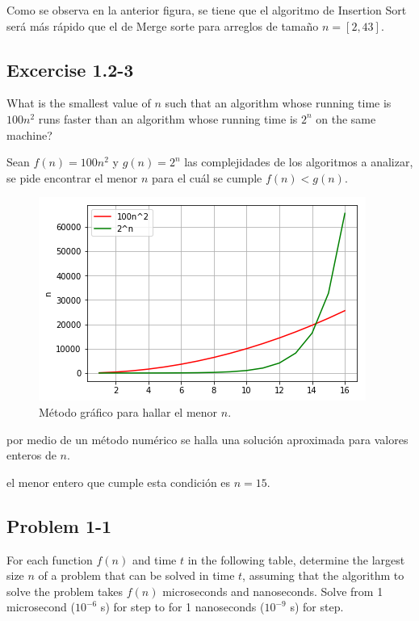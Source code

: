\documentclass{article}
\begin{document}
Como se observa en la anterior figura, se tiene que el algoritmo de Insertion Sort será más rápido que el de Merge sorte para arreglos de tamaño $n = [2, 43]$.

\subsection{Excercise 1.2-3}
What is the smallest value of $n$ such that an algorithm whose running time is $100n^2$ runs faster than an algorithm whose running time is $2^n$ on the same machine?

Sean $f(n) = 100n^2$ y $g(n) = 2^n$ las complejidades de los algoritmos a analizar, se pide encontrar el menor $n$ para el cuál se cumple $f(n) < g(n)$.

\begin{figure}[H]
  \centering
  \includegraphics[width=\textwidth]{./img/CLRS_2_1}
  \caption{Método gráfico para hallar el menor $n$.}
  \label{fig:CLRS_2_1}
\end{figure}

por medio de un método numérico se halla una solución aproximada para valores enteros de $n$.

el menor entero que cumple esta condición es $n = 15$.

\subsection{Problem 1-1}
For each function $f(n)$ and time $t$ in the following table, determine the largest size $n$ of a problem that can be solved in time $t$, assuming that the algorithm to solve the problem takes $f(n)$ microseconds and nanoseconds.
Solve from 1 microsecond ($10^{-6}$ s) for step to for 1 nanoseconds ($10^{-9}$ s) for step.
\end{document}

